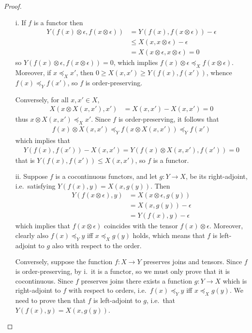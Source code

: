 \begin{proof}
\begin{itemize}
\item[i.] If $f$ is a functor then 
\begin{align*}
Y(f(x)\otimes \epsilon, f(x\otimes \epsilon))&= Y(f(x), f(x\otimes \epsilon)) -\epsilon \\
&\leq X(x, x\otimes \epsilon)-\epsilon \\
&= X(x\otimes \epsilon, x\otimes \epsilon)=0
\end{align*}
so $Y(f(x)\otimes \epsilon, f(x\otimes \epsilon))=0$, which implies
$f(x)\otimes \epsilon \preceq_{X}f(x\otimes \epsilon)$. 
Moreover, if $x\preceq_{X}x'$, then $0\geq X(x,x')\geq Y(f(x),f(x'))$, whence 
$f(x)\preceq_{Y}f(x')$, so $f$ is order-preserving. 

Conversely, for all $x,x'\in X$, 
\begin{align*}
X(x\otimes X(x,x'), x') &=X(x,x')-X(x,x')=0 
\end{align*}
thus $x\otimes X(x,x') \preceq_{X}x'$. Since $f$ is order-preserving, it follows that
\begin{align*}
f(x)\otimes X(x,x') \preceq_{Y}f(x\otimes X(x,x'))\preceq_{Y}f(x') 
\end{align*}
which implies that 
\begin{align*}
Y(f(x),f(x')) - X(x,x') = Y(f(x)\otimes X(x,x'), f(x'))=0
\end{align*}
that is $Y(f(x),f(x'))\leq X(x,x')$, so $f$ is a functor. 

\item[ii.]
Suppose $f$ is a cocontinuous functors, and let  $g:Y\to X$, be its right-adjoint, i.e.~satisfying $Y(f(x),y)=X(x,g(y))$. Then 
\begin{align*}
Y(f(x\otimes \epsilon), y)& = X(x\otimes \epsilon, g(y)) \\
&= X(x, g(y))-\epsilon \\
&= Y(f(x), y)-\epsilon
\end{align*}
which implies that $f(x\otimes \epsilon)$ coincides with the tensor $f(x)\otimes \epsilon$. 
Moreover, clearly also $f(x)\preceq_{Y}y$ iff $x\preceq_{X}g(y)$ holds, which means that $f$ is left-adjoint to $g$ also with respect to the order. 

Conversely, suppose the function $f:X\to Y$ preserves joins and tensors. Since $f$ is order-preserving, by i.~it is a functor, so we must only prove that it is cocontinuous.
Since $f$ preserves joins there exists a function $g:Y\to X$ which is right-adjoint to $f$ with respect to orders, i.e.~$f(x)\preceq_{Y}y$ iff $x\preceq_{X}g(y)$. 
We need to prove then that $f$ is left-adjoint to $g$, i.e.~that $Y(f(x),y)=X(x,g(y))$.


\end{itemize}
\end{proof}
